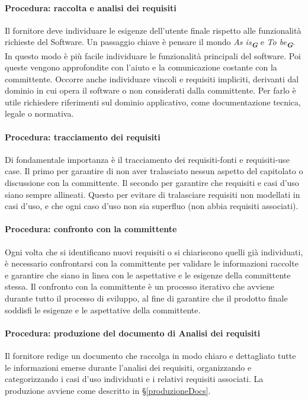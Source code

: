 \documentclass[a4paper,12pt]{article}
\newcommand{\glossario}[1]{\textit{#1}\textsubscript{\textbf{\textit{\textcolor{lightblack}{G}}}}}
\begin{document}
\paragraph{Procedura: raccolta e analisi dei requisiti}
Il fornitore deve individuare le esigenze dell'utente finale rispetto alle
funzionalità richieste del Software. Un passaggio chiave è pensare il mondo
\glossario{As is} e \glossario{To be}. In questo modo è più facile individuare
le funzionalità principali del software. Poi queste vengono approfondite con
l'aiuto e la comunicazione costante con la committente. Occorre anche
individuare vincoli e requisiti impliciti, derivanti dal dominio in cui opera
il software o non considerati dalla committente. Per farlo è utile richiedere
riferimenti sul dominio applicativo, come documentazione tecnica, legale o
normativa.

\paragraph{Procedura: tracciamento dei requisiti}
Di fondamentale importanza è il tracciamento dei requisiti-fonti e requisiti-use case.
Il primo per garantire di non aver tralasciato nessun aspetto del capitolato o discussione
con la committente. Il secondo per garantire che requisiti e casi d'uso siano sempre allineati.
Questo per evitare di tralasciare requisiti non modellati in casi d'uso, e che ogni caso d'uso non sia superfluo (non abbia requisiti associati).

\paragraph{Procedura: confronto con la committente}
Ogni volta che si identificano nuovi requisiti o si chiariscono quelli già
individuati, è necessario confrontarsi con la committente per validare le
informazioni raccolte e garantire che siano in linea con le aspettative e le
esigenze della committente stessa. Il confronto con la committente è un
processo iterativo che avviene durante tutto il processo di sviluppo, al fine
di garantire che il prodotto finale soddisfi le esigenze e le aspettative della
committente.

\paragraph{Procedura: produzione del documento di Analisi dei requisiti}
Il fornitore redige un documento che raccolga in modo chiaro e dettagliato
tutte le informazioni emerse durante l'analisi dei requisiti, organizzando e
categorizzando i casi d'uso individuati e i relativi requisiti associati. La
produzione avviene come descritto in §\ref{produzioneDocs}.
\end{document}

